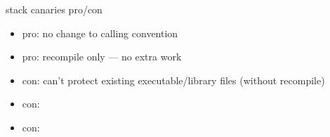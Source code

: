 
\begin{frame}{stack canaries pro/con}
    \begin{itemize}
        \item pro: no change to calling convention
        \item pro: recompile only --- no extra work
        \item con: can't protect existing executable/library files (without recompile)
        \item con: 
        \item con: 
    \end{itemize}
\end{frame}


